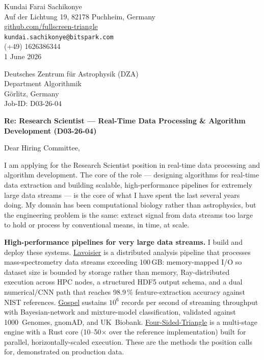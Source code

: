 \documentclass[12pt,a4paper]{article}
\begin{document}
\begin{flushright}
Kundai Farai Sachikonye \\
Auf der Lichtung 19, 82178 Puchheim, Germany \\
\href{https://github.com/fullscreen-triangle}{github.com/fullscreen-triangle} \\
\texttt{kundai.sachikonye@bitspark.com} \\
(+49) 1626386344 \\[6pt]
1 June 2026
\end{flushright}

\vspace{1em}

Deutsches Zentrum f\"ur Astrophysik (DZA) \\
Department Algorithmik \\
G\"orlitz, Germany \\
Job-ID: D03-26-04

\vspace{1.5em}

\textbf{Re: Research Scientist --- Real-Time Data Processing \& Algorithm
Development (D03-26-04)}

\vspace{1em}

Dear Hiring Committee,

I am applying for the Research Scientist position in real-time data processing
and algorithm development. The core of the role --- designing algorithms for
real-time data extraction and building scalable, high-performance pipelines for
extremely large data streams --- is the core of what I have spent the last
several years doing. My domain has been computational biology rather than
astrophysics, but the engineering problem is the same: extract signal from data
streams too large to hold or process by conventional means, in time, at scale.

\textbf{High-performance pipelines for very large data streams.}
I build and deploy these systems. \href{https://github.com/fullscreen-triangle/lavoisier}{Lavoisier}
is a distributed analysis pipeline that processes mass-spectrometry data streams
exceeding 100\,GB: memory-mapped I/O so dataset size is bounded by storage rather
than memory, Ray-distributed execution across HPC nodes, a structured HDF5 output
schema, and a dual numerical/CNN path that reaches 98.9\,\% feature-extraction
accuracy against NIST references. \href{https://github.com/fullscreen-triangle/gospel}{Gospel}
sustains $10^6$ records per second of streaming throughput with Bayesian-network
and mixture-model classification, validated against 1000~Genomes, gnomAD, and
UK~Biobank. \href{https://github.com/fullscreen-triangle/four-sided-triangle}{Four-Sided-Triangle}
is a multi-stage engine with a Rust core (10--50$\times$ over the reference
implementation) built for parallel, horizontally-scaled execution. These are the
methods the position calls for, demonstrated on production data.
\end{document}
